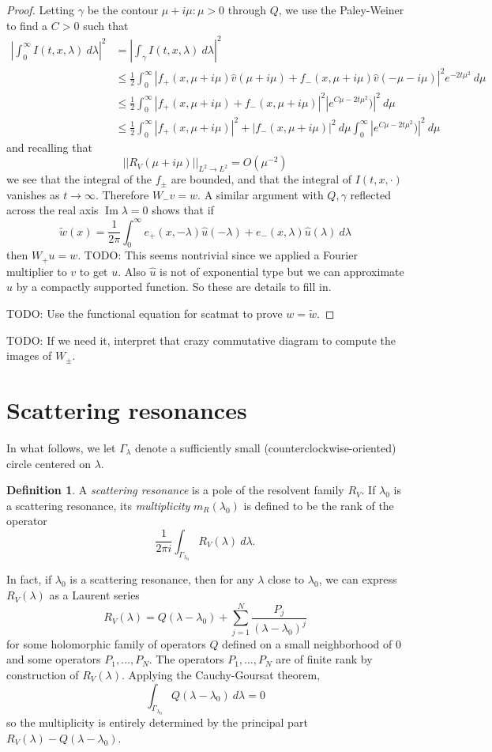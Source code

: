 \documentclass[12pt]{report}
\newcommand{\dfn}[1]{\emph{#1}\index{#1}}
\renewcommand{\Im}{\operatorname{Im}}
\theoremstyle{definition}
\newtheorem{definition}[theorem]{Definition}
\begin{document}
\begin{proof}
Letting $\gamma$ be the contour $\mu + i\mu: \mu > 0$ through $Q$, we use the Paley-Weiner to find a $C > 0$ such that
\begin{align*}
  \left|\int_0^\infty I(t, x, \lambda) ~d\lambda\right|^2 &= \left|\int_\gamma I(t, x, \lambda) ~d\lambda\right|^2 \\
    &\leq \frac{1}{2} \int_0^\infty |f_+(x, \mu + i\mu)\hat v(\mu + i\mu) + f_-(x, \mu+i\mu)\hat v(-\mu - i\mu)|^2e^{-2t\mu^2} ~d\mu\\
    &\leq \frac{1}{2} \int_0^\infty |f_+(x, \mu + i\mu) + f_-(x, \mu + i\mu)|^2 |e^{C\mu - 2t\mu^2})|^2 ~d\mu\\
    &\leq \frac{1}{2} \int_0^\infty |f_+(x, \mu + i\mu)|^2 + |f_-(x, \mu + i\mu)|^2 ~d\mu \int_0^\infty |e^{C\mu - 2t\mu^2})|^2 ~d\mu
\end{align*}
and recalling that
$$||R_V(\mu + i\mu)||_{L^2 \to L^2} = O(\mu^{-2})$$
we see that the integral of the $f_\pm$ are bounded, and that the integral of $I(t, x, \cdot)$ vanishes as $t \to \infty$. Therefore $W_-v = w$. A similar argument with $Q, \gamma$ reflected across the real axis $\Im \lambda = 0$ shows that if
$$\tilde w(x) = \frac{1}{2\pi} \int_0^\infty e_+(x, -\lambda)\hat u(-\lambda) + e_-(x, \lambda)\hat u(\lambda) ~d\lambda$$
then $W_+u = w$. TODO: This seems nontrivial since we applied a Fourier multiplier to $v$ to get $u$. Also $\hat u$ is not of exponential type but we can approximate $u$ by a compactly supported function. So these are details to fill in.

TODO: Use the functional equation for scatmat to prove $w = \tilde w$.
\end{proof}

TODO: If we need it, interpret that crazy commutative diagram to compute the images of $W_\pm$.




\section{Scattering resonances}
In what follows, we let $\Gamma_\lambda$ denote a sufficiently small (counterclockwise-oriented) circle centered on $\lambda$.

\begin{definition}
A \dfn{scattering resonance} is a pole of the resolvent family $R_V$. If $\lambda_0$ is a scattering resonance, its \dfn{multiplicity} $m_R(\lambda_0)$ is defined to be the rank of the operator
$$\frac{1}{2\pi i} \int_{\Gamma_{\lambda_0}} R_V(\lambda) ~d\lambda.$$
\end{definition}
In fact, if $\lambda_0$ is a scattering resonance, then for any $\lambda$ close to $\lambda_0$, we can express $R_V(\lambda)$ as a Laurent series
$$R_V(\lambda) = Q(\lambda - \lambda_0) + \sum_{j=1}^N \frac{P_j}{(\lambda - \lambda_0)^j}$$
for some holomorphic family of operators $Q$ defined on a small neighborhood of $0$ and some operators $P_1, \dots, P_N$. The operators $P_1, \dots, P_N$ are of finite rank by construction of $R_V(\lambda)$. Applying the Cauchy-Goursat theorem,
$$\int_{\Gamma_{\lambda_0}} Q(\lambda - \lambda_0) ~d\lambda = 0$$
so the multiplicity is entirely determined by the principal part $R_V(\lambda) - Q(\lambda - \lambda_0)$.
\end{document}
